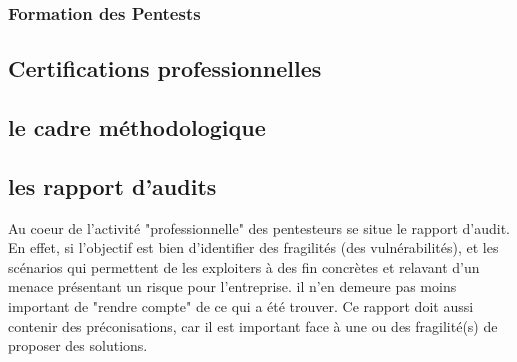\subsubsection{Formation des Pentests}

\subsection {Certifications professionnelles}

\subsection {le cadre méthodologique}


\subsection {les rapport d'audits}

Au coeur de l'activité "professionnelle" des pentesteurs se situe le rapport d'audit.
En effet, si l'objectif est bien d'identifier des fragilités (des vulnérabilités), et les scénarios qui permettent de les exploiters à des fin concrètes et relavant d'un menace présentant un risque pour l'entreprise.
il n'en demeure pas moins important  de "rendre compte" de ce qui a été trouver. Ce rapport doit aussi contenir des préconisations, car il est important face à une ou des fragilité(s) de proposer des solutions. 




